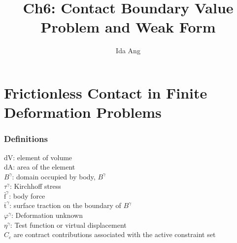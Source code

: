 \documentclass[12pt,3p]{article}
\numberwithin{equation}{section}
\begin{document}
\title{Ch6: Contact Boundary Value Problem and Weak Form}
\author{Ida Ang}
\date{\vspace{-5ex}}
\maketitle

\tableofcontents
\newpage

\section{Frictionless Contact in Finite Deformation Problems}
\subsubsection{Definitions}
dV: element of volume \\
dA: area of the element \\
$B^\gamma$: domain occupied by body, $B^\gamma$ \\
$\tau^\gamma$: Kirchhoff stress \\
$\bar{\text{f}}^\gamma$: body force \\
$\bar{\text{t}}^\gamma$: surface traction on the boundary of $B^\gamma$ \\
$\varphi^\gamma$: Deformation unknown \\
$\eta^\gamma$: Test function or virtual displacement \\
$C_c$ are contract contributions associated with the active constraint set 
\end{document}
